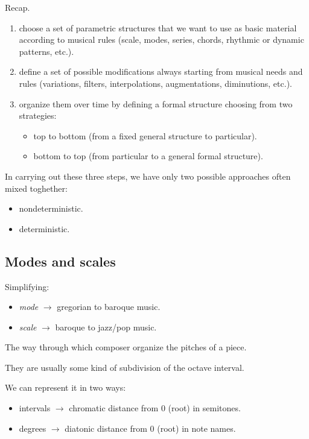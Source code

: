 Recap.

\begin{enumerate}
\def\labelenumi{\arabic{enumi}.}
\tightlist
\item choose a set of parametric structures that we want to use as basic material according to musical rules (scale, modes, series, chords, rhythmic or dynamic patterns, etc.).
\item define a set of possible modifications always starting from musical needs and rules (variations, filters, interpolations, augmentations, diminutions, etc.).
\item organize them over time by defining a formal structure choosing from two strategies:
  \begin{itemize}
  \tightlist
  \item top to bottom (from a fixed general structure to particular).
  \item bottom to top (from particular to a general formal structure).
  \end{itemize}
\end{enumerate}

In carrying out these three steps, we have only two possible approaches often mixed toghether:

\begin{itemize}
\tightlist
\item nondeterministic.
\item deterministic.
\end{itemize}

\subsection{Modes and scales}\label{modes-and-scales}

Simplifying:

\begin{itemize}
\tightlist
\item \textit{mode} \(\rightarrow\) gregorian to baroque music. 
\item \textit{scale} \(\rightarrow\) baroque to jazz/pop music.
\end{itemize}
  
The way through which composer organize the pitches of a piece.

They are usually some kind of subdivision of the octave interval.

We can represent it in two ways:

\begin{itemize}
\tightlist
\item intervals \(\rightarrow\) chromatic distance from 0 (root) in semitones.  
\item degrees \(\rightarrow\) diatonic distance from 0 (root) in note names.
\end{itemize}

